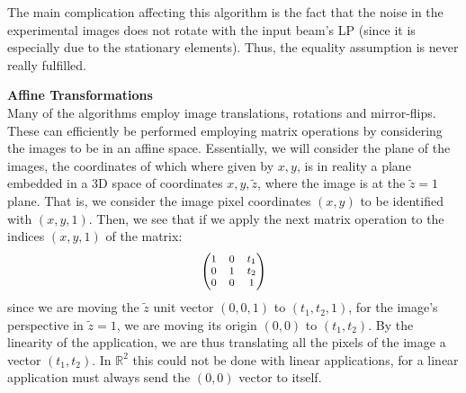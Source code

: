 \documentclass[11pt, a4paper, twoside]{article} %
\newcommand{\R}{\mathbb{R}} %
\DeclareRobustCommand{\mybox}[2][gray!10]{%
\begin{tcolorbox}[   %
        left=0.2cm,
        right=0.2cm,
        top=0.15cm,
        bottom=0.15cm,
        colback=#1,
        colframe=#1,
        width=\dimexpr\textwidth\relax, 
        enlarge left by=0mm,
        boxsep=5pt,
        arc=0pt,outer arc=0pt,
        ]
        #2
\end{tcolorbox}
}
\begin{document}
The main complication affecting this algorithm is the fact that the noise in the experimental images does not rotate with the input beam's LP (since it is especially due to the stationary elements). Thus, the equality assumption is never really fulfilled.

\mybox{{\bf Affine Transformations \vspace{0.2cm} \\}
Many of the algorithms employ image translations, rotations and mirror-flips. These can efficiently be performed employing matrix operations by considering the images to be in an affine space. Essentially, we will consider the plane of the images, the coordinates of which where given by $x,y$, is in reality a plane embedded in a 3D space of coordinates $x,y,\tilde{z}$, where the image is at the $\tilde{z}=1$ plane. That is, we consider the image pixel coordinates $(x,y)$ to be identified with $(x,y,1)$. Then, we see that if we apply the next matrix operation to the indices $(x,y,1)$ of the matrix:
\begin{equation}
\footnotesize
\begin{pmatrix}
1 & 0 & t_1\\
0 & 1 & t_2 \\
0 & 0 & 1
\end{pmatrix}
\end{equation}
since we are moving the $\tilde{z}$ unit vector $(0,0,1)$ to $(t_1,t_2,1)$, for the image's perspective in $\tilde{z}=1$, we are moving its origin $(0,0)$ to $(t_1,t_2)$. By the linearity of the application, we are thus translating all the pixels of the image a vector $(t_1,t_2)$. In $\R^2$ this could not be done with linear applications, for a linear application must always send the $(0,0)$ vector to itself.\vspace{0.2cm}

}
\end{document}
